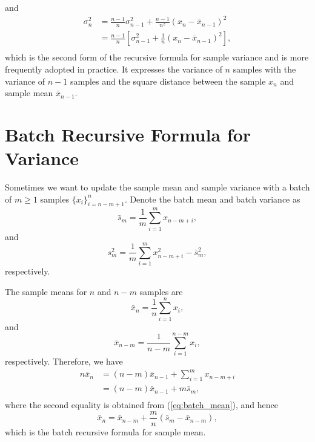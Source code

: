 \documentclass{article}
\begin{document}
and
\begin{equation}
  \begin{aligned}
    \sigma_n^2
    &=\frac{n-1}{n}\sigma_{n-1}^2+\frac{n-1}{n^2}(x_n-\bar{x}_{n-1})^2\\
    &=\frac{n-1}{n}\left[\sigma_{n-1}^2+\frac{1}{n}(x_n-\bar{x}_{n-1})^2\right],\\
  \end{aligned}
\end{equation}
which is the second form of the recursive formula for sample variance and is more frequently adopted in practice. It expresses the variance of $n$ samples with the variance of $n-1$ samples and the square distance between the sample $x_n$ and sample mean $\bar{x}_{n-1}$.

\section{Batch Recursive Formula for Variance}

Sometimes we want to update the sample mean and sample variance with a batch of $m\geqslant1$ samples $\{x_i\}_{i=n-m+1}^n$. Denote the batch mean and batch variance as
\begin{equation}
  \label{eq:batch_mean}
  \bar{s}_m=\frac{1}{m}\sum_{i=1}^m x_{n-m+i},
\end{equation}
and
\begin{equation}
  \label{eq:batch_var}
  s^2_m=\frac{1}{m}\sum_{i=1}^m x_{n-m+i}^2-\bar{s}_m^2,
\end{equation}
respectively. 

The sample means for $n$ and $n-m$ samples are
\begin{equation}
  \bar{x}_n=\frac{1}{n}\sum_{i=1}^nx_i,
\end{equation}
and
\begin{equation}
  \bar{x}_{n-m}=\frac{1}{n-m}\sum_{i=1}^{n-m}x_i,
\end{equation}
respectively. Therefore, we have
\begin{equation}
  \label{eq:mean_diff_batch}
  \begin{aligned}
    n\bar{x}_n
    &=(n-m)\bar{x}_{n-1}+\sum_{i=1}^m x_{n-m+i}\\
    &=(n-m)\bar{x}_{n-1}+m\bar{s}_m,\\
  \end{aligned}
\end{equation}
where the second equality is obtained from (\ref{eq:batch_mean}), and hence
\begin{equation}
  \label{eq:recursive_mean_batch}
  \bar{x}_n=\bar{x}_{n-m}+\frac{m}{n}(\bar{s}_m-\bar{x}_{n-m}),
\end{equation}
which is the batch recursive formula for sample mean.
\end{document}
